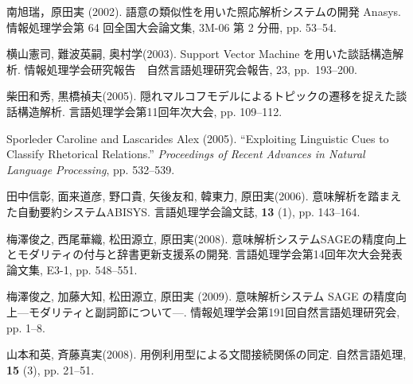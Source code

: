 \documentclass[japanese]{jnlp_1.4}
\begin{document}
\begin{thebibliography}{99}
\item
南旭瑞，原田実 (2002). 語意の類似性を用いた照応解析システムの開発 Anasys. 情報処理学会第 64 回全国大会論文集, 3M-06 第 2 分冊, pp. 53--54.

\item
横山憲司, 難波英嗣, 奥村学(2003). Support Vector Machine を用いた談話構造解析. 情報処理学会研究報告　自然言語処理研究会報告, 23, pp.~193--200.

\item
柴田和秀, 黒橋禎夫(2005). 隠れマルコフモデルによるトピックの遷移を捉えた談話構造解析. 言語処理学会第11回年次大会, pp. 109--112.

\item
Sporleder Caroline and Lascarides Alex (2005). ``Exploiting Linguistic Cues to Classify Rhetorical Relations.'' \textit{Proceedings of Recent Advances in Natural Language Processing}, pp. 532--539.

\item
田中信彰, 面来道彦, 野口貴, 矢後友和, 韓東力, 原田実(2006). 意味解析を踏まえた自動要約システムABISYS. 言語処理学会論文誌, \textbf{13} (1), pp. 143--164.

\item
梅澤俊之, 西尾華織, 松田源立, 原田実(2008). 意味解析システムSAGEの精度向上とモダリティの付与と辞書更新支援系の開発. 言語処理学会第14回年次大会発表論文集, E3-1, pp. 548--551.

\item
梅澤俊之, 加藤大知, 松田源立, 原田実 (2009). 意味解析システム SAGE の精度向上—モダリティと副詞節について—. 情報処理学会第191回自然言語処理研究会, pp. 1--8.

\item
山本和英, 斉藤真実(2008). 用例利用型による文間接続関係の同定. 自然言語処理, \textbf{15} (3), pp. 21--51.

\end{thebibliography}


\begin{biography}

\end{biography}



\biodate
\end{document}
